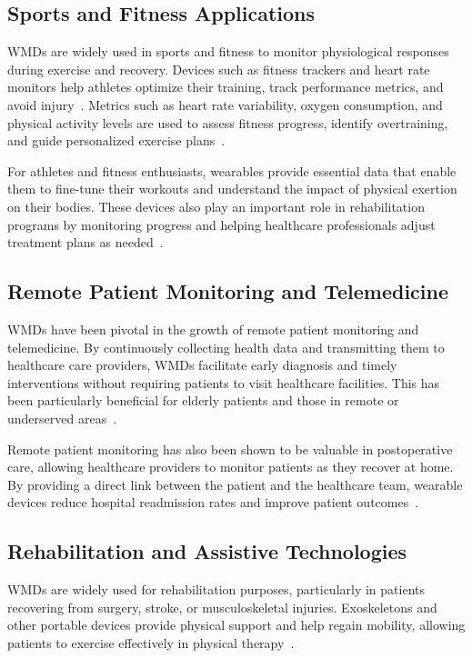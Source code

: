 \documentclass[journal]{IEEEtran}
\begin{document}
    \subsection{Sports and Fitness Applications}

    WMDs are widely used in sports and fitness to monitor physiological responses during exercise and recovery. Devices such as fitness trackers and heart rate monitors help athletes optimize their training, track performance metrics, and avoid injury~\cite{Iqbal2016}. Metrics such as heart rate variability, oxygen consumption, and physical activity levels are used to assess fitness progress, identify overtraining, and guide personalized exercise plans~\cite{Cusack2024}.

    For athletes and fitness enthusiasts, wearables provide essential data that enable them to fine-tune their workouts and understand the impact of physical exertion on their bodies. These devices also play an important role in rehabilitation programs by monitoring progress and helping healthcare professionals adjust treatment plans as needed~\cite{Cusack2024}.

    \subsection{Remote Patient Monitoring and Telemedicine}

    WMDs have been pivotal in the growth of remote patient monitoring and telemedicine. By continuously collecting health data and transmitting them to healthcare care providers, WMDs facilitate early diagnosis and timely interventions without requiring patients to visit healthcare facilities. This has been particularly beneficial for elderly patients and those in remote or underserved areas~\cite{Nahavandi2022, Babu2024, Dias2018}.

    Remote patient monitoring has also been shown to be valuable in postoperative care, allowing healthcare providers to monitor patients as they recover at home. By providing a direct link between the patient and the healthcare team, wearable devices reduce hospital readmission rates and improve patient outcomes~\cite{Dias2018}.

    \subsection{Rehabilitation and Assistive Technologies}

    WMDs are widely used for rehabilitation purposes, particularly in patients recovering from surgery, stroke, or musculoskeletal injuries. Exoskeletons and other portable devices provide physical support and help regain mobility, allowing patients to exercise effectively in physical therapy~\cite{Hemapriya2017, Babu2024, Dias2018}.
\end{document}
